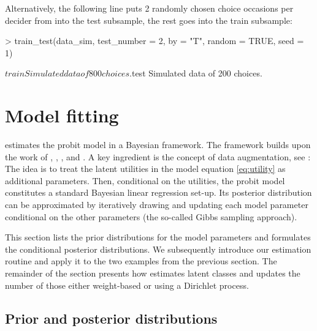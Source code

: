 \documentclass[article]{jss}
\newcommand{\fct}[1]{\code{#1()}}
\begin{document}
Alternatively, the following line puts 2 randomly chosen choice occasions per decider from  into the test subsample, the rest goes into the train subsample:

\begin{Schunk}
\begin{Sinput}
> train_test(data_sim, test_number = 2, by = "T", random = TRUE, seed = 1)
\end{Sinput}
\begin{Soutput}
$train
Simulated data of 800 choices.

$test
Simulated data of 200 choices.
\end{Soutput}
\end{Schunk}

\section{Model fitting} \label{sec:model_fitting}

 estimates the probit model in a Bayesian framework. The framework builds upon the work of \cite{McCulloch:1994}, \cite{Nobile:1998}, \cite{Allenby:1998}, and \cite{Imai:2005}. A key ingredient is the concept of data augmentation, see \cite{Albert:1993}: The idea is to treat the latent utilities in the model equation \eqref{eq:utility} as additional parameters. Then, conditional on the utilities, the probit model constitutes a standard Bayesian linear regression set-up. Its posterior distribution can be approximated by iteratively drawing and updating each model parameter conditional on the other parameters (the so-called Gibbs sampling approach).

This section lists the prior distributions for the model parameters and formulates the conditional posterior distributions. We subsequently introduce our estimation routine \fct{fit\_model} and apply it to the two examples from the previous section. The remainder of the section presents how  estimates latent classes and updates the number of those either weight-based or using a Dirichlet process.

\subsection{Prior and posterior distributions} \label{subsec:prior_and_posterior}
\end{document}
